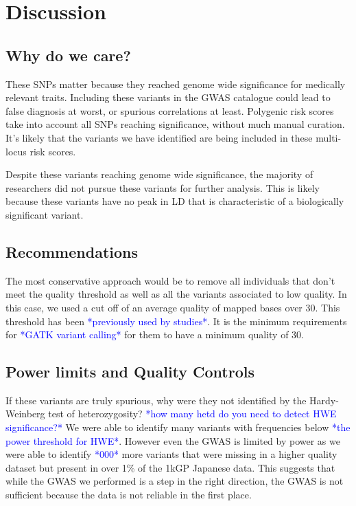 \documentclass[9pt,lineno]{elife}
\newcommand{\todo}[1]{\textcolor{blue}{*#1*}}
\begin{document}
			\section{Discussion}
\subsection{Why do we care?}
These SNPs matter because they reached genome wide significance for medically relevant traits. 
Including these variants in the GWAS catalogue could lead to false diagnosis at worst, or spurious correlations at least. 
Polygenic risk scores take into account all SNPs reaching significance, without much manual curation. 
It's likely that the variants we have identified are being included in these multi-locus risk scores.

Despite these variants reaching genome wide significance, the majority of researchers did not pursue these variants for further analysis.
This is likely because these variants have no peak in LD that is characteristic of a biologically significant variant.

\subsection{Recommendations}
The most conservative approach would be to remove all individuals that don't meet the quality threshold as well as all the variants associated to low quality.
In this case, we used a cut off of an average quality of mapped bases over 30. This threshold has been \todo{previously used by studies}. It is the minimum requirements for \todo{GATK variant calling} for them to have a minimum quality of 30.

\subsection{Power limits and Quality Controls}
If these variants are truly spurious, why were they not identified by the Hardy-Weinberg test of heterozygosity?
\todo{how many hetd do you need to detect HWE significance?}
We were able to identify many variants with frequencies below \todo{the power threshold for HWE}.
However even the GWAS is limited by power as we were able to identify \todo{000} more variants that were missing in a higher quality dataset but present in over 1\% of the 1kGP Japanese data. 
This suggests that while the GWAS we performed is a step in the right direction, the GWAS is not sufficient because the data is not reliable in the first place. 
\end{document}
